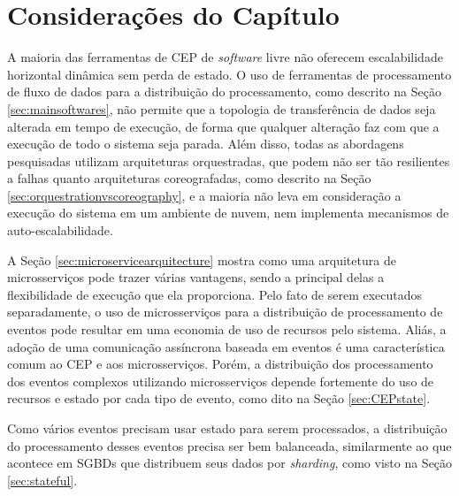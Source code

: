 \section{Considerações do Capítulo}
\label{sec:conclusions}

A maioria das ferramentas de CEP de \textit{software} livre não oferecem escalabilidade horizontal dinâmica sem perda de estado. O uso de ferramentas de processamento de fluxo de dados para a distribuição do processamento, como descrito na Seção \ref{sec:mainsoftwares}, não permite que a topologia de transferência de dados seja alterada em tempo de execução, de forma que qualquer alteração faz com que a execução de todo o sistema seja parada. Além disso, todas as abordagens pesquisadas utilizam arquiteturas orquestradas, que podem não ser tão resilientes a falhas quanto arquiteturas coreografadas, como descrito na Seção \ref{sec:orquestrationvscoreography}, e a maioria não leva em consideração a execução do sistema em um ambiente de nuvem, nem implementa mecanismos de auto-escalabilidade.

A Seção \ref{sec:microservicearquitecture} mostra como uma arquitetura de microsserviços pode trazer várias vantagens, sendo a principal delas a flexibilidade de execução que ela proporciona. Pelo fato de serem executados separadamente, o uso de microsserviços para a distribuição de processamento de eventos pode resultar em uma economia de uso de recursos pelo sistema. Aliás, a adoção de uma comunicação assíncrona baseada em eventos é uma característica comum ao CEP e aos microsserviços. Porém, a distribuição dos processamento dos eventos complexos utilizando microsserviços depende fortemente do uso de recursos e estado por cada tipo de evento, como dito na Seção \ref{sec:CEPstate}.

Como vários eventos precisam usar estado para serem processados, a distribuição do processamento desses eventos precisa ser bem balanceada, similarmente ao que acontece em SGBDs que distribuem seus dados por \textit{sharding}, como visto na Seção \ref{sec:stateful}. 


